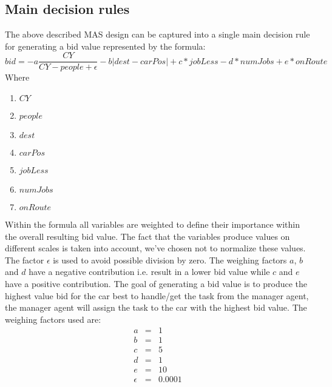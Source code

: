 \documentclass[a4paper,11pt]{article}
\begin{document}
\subsection{Main decision rules}
The above described MAS design can be captured into a single main decision rule for generating a bid value represented by the formula:
\newline
\[bid = -a\frac{CY}{CY-people+\epsilon} - b|dest - carPos| + c*jobLess - d*numJobs + e*onRoute\]
\newline\newline
Where
\begin{enumerate}
	\item[] $CY$
	\item[] $people$
	\item[] $dest$ 
	\item[] $carPos$  
	\item[] $jobLess$ 
	\item[] $numJobs$
	\item[] $onRoute$ 
\end{enumerate}

Within the formula all variables are weighted to define their importance within the overall resulting bid value. The fact that the variables produce values on different scales is taken into account, we've chosen not to normalize these values. The factor $\epsilon$ is used to avoid possible division by zero. The weighing factors $a$, $b$ and $d$ have a negative contribution i.e. result in a lower bid value while $c$ and $e$ have a positive contribution. The goal of generating a bid value is to produce the highest value bid for the car best to handle/get the task from the manager agent, the manager agent will assign the task to the car with the highest bid value. The weighing factors used are:
\[\begin{array}{lcl}
a & = & 1\\
b & = & 1\\
c & = & 5\\
d & = & 1\\
e & = & 10\\
\epsilon & = & 0.0001
\end{array}\]
\end{document}
